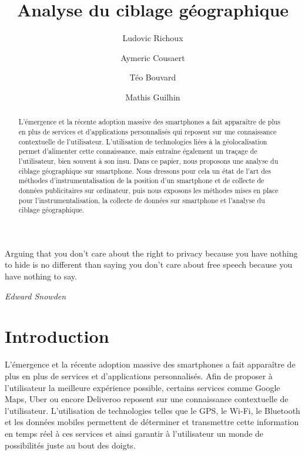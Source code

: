 \documentclass[runningheads]{llncs}
\begin{document}
\title{Analyse du ciblage géographique} 

\author{
    Ludovic Richoux \and
    Aymeric Cousaert \and
    Téo Bouvard \and 
    Mathis Guilhin
}

%


\maketitle

\epigraph{
    Arguing that you don't care about the right to privacy because you have nothing to hide is no different than saying you don't care about free speech because you have nothing to say. \cite{edward_snowden_riama_2015}}{\textit{Edward Snowden}
}

\begin{abstract}

L'émergence et la récente adoption massive des smartphones a fait apparaître de plus en plus de services et d'applications personnalisés qui reposent sur une connaissance contextuelle de l'utilisateur. L'utilisation de technologies liées à la géolocalisation permet d'alimenter cette connaissance, mais entraîne également un traçage de l'utilisateur, bien souvent à son insu. Dans ce papier, nous proposons une analyse du ciblage géographique sur smartphone. Nous dressons pour cela un état de l'art des méthodes d'instrumentalisation de la position d'un smartphone et de collecte de données publicitaires sur ordinateur, puis nous exposons les méthodes mises en place pour l'instrumentalisation, la collecte de données sur smartphone et l'analyse du ciblage géographique.


\end{abstract}

\section{Introduction}

L'émergence et la récente adoption massive des smartphones\cite{pew_research_center_demographics_2019} a fait apparaître de plus en plus de services et d'applications personnalisés. Afin de proposer à l'utilisateur la meilleure expérience possible, certains services comme Google Maps, Uber ou encore Deliveroo reposent sur une connaissance contextuelle de l'utilisateur. L'utilisation de technologies telles que le GPS, le Wi-Fi, le Bluetooth et les données mobiles permettent de déterminer et transmettre cette information en temps réel à ces services et ainsi garantir à l'utilisateur un monde de possibilités juste au bout des doigts. 
\end{document}
